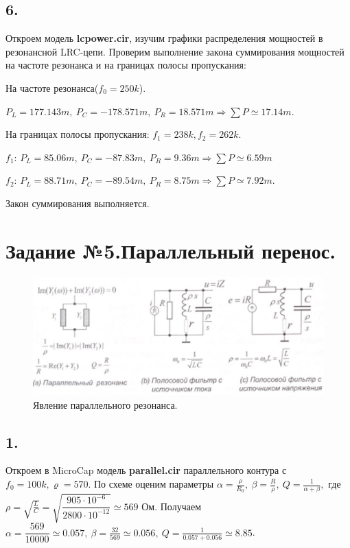 \documentclass[a4paper, 12pt, twoside]{article}
\begin{document}
\subsection*{6.}

Откроем модель \textbf{lcpower.cir}, изучим графики распределения мощностей в резонансной LRC-цепи. Проверим выполнение закона суммирования мощностей на частоте резонанса и на границах полосы пропускания:

На частоте резонанса($f_0 = 250k$).

$P_L = 177.143m, ~ P_C = -178.571m,~P_R = 18.571m\Rightarrow \sum P \simeq 17.14m$.

На границах полосы пропускания: $f_1 = 238k, f_2 = 262k.$

$f_1$: $P_L = 85.06m,~P_C=-87.83m,~ P_R = 9.36m \Rightarrow \sum P \simeq 6.59m$

$f_2$: $P_L = 88.71m, ~ P_C = -89.54m, ~ P_R = 8.75m \Rightarrow \sum P \simeq 7.92m$.

Закон суммирования выполняется.

\newpage



\section*{Задание №5.Параллельный перенос.}

\begin{figure}[H]
	\includegraphics[width =  0.9\linewidth]{parrez}
	\caption{Явление параллельного резонанса.}

\end{figure}

\subsection*{1.}
Откроем в MicroCap модель \textbf{parallel.cir} параллельного контура с $f_0 = 100k, \varrho = 570$. По схеме оценим параметры $\alpha = \frac{\rho}{R_0}, ~\beta = \frac{R}{\rho}, ~ Q = \frac{1}{\alpha + \beta},$ где $\rho = \sqrt{\frac{L}{C}} = \sqrt{\dfrac{905\cdot10^{-6}}{2800\cdot10^{-12}}} \simeq 569 $ Ом. Получаем \underline{$\alpha = \dfrac{569}{10000} \simeq 0.057,~ \beta = \frac{32}{569} \simeq 0.056, ~ Q = \frac{1}{0.057+0.056} \simeq 8.85$}.
\end{document}
